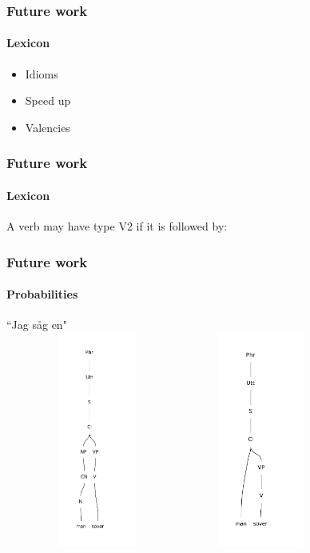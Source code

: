 \documentclass[10pt]{beamer}
\renewcommand{\baselinestretch}{1.5}
\begin{document}
\begin{frame}
 \renewcommand{\baselinestretch}{1.0}
\frametitle{Future work}
\framesubtitle{Lexicon} 
\begin{itemize}
\item Idioms
\item Speed up
\item Valencies
\end{itemize}
\end{frame}


\begin{frame}
 \renewcommand{\baselinestretch}{1.0}
\frametitle{Future work}
\framesubtitle{Lexicon} 
A verb may have type V2 if it is followed by:
\end{frame}


\begin{frame}
\renewcommand{\baselinestretch}{1.0}
\frametitle{Future work}
\framesubtitle{Probabilities} 
\center
``Jag såg en"\\
\includegraphics[width=170pt,height=200pt]{man1.pdf}
\includegraphics[width=130pt,height=200pt]{man.pdf}
\end{frame}
\end{document}
